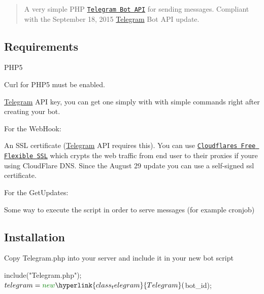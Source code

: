 \begin{quote}
A very simple P\+H\+P \href{https://core.telegram.org/bots}{\tt Telegram Bot A\+P\+I} for sending messages. Compliant with the September 18, 2015 \hyperlink{class_telegram}{Telegram} Bot A\+P\+I update. \end{quote}


\subsection*{Requirements }


\begin{DoxyItemize}
\item P\+H\+P5
\item Curl for P\+H\+P5 must be enabled.
\item \hyperlink{class_telegram}{Telegram} A\+P\+I key, you can get one simply with \href{https://core.telegram.org/bots#botfather}{\tt } with simple commands right after creating your bot.
\end{DoxyItemize}

For the Web\+Hook\+:
\begin{DoxyItemize}
\item An S\+S\+L certificate (\hyperlink{class_telegram}{Telegram} A\+P\+I requires this). You can use \href{https://www.cloudflare.com/ssl}{\tt Cloudflare\textquotesingle{}s Free Flexible S\+S\+L} which crypts the web traffic from end user to their proxies if you\textquotesingle{}re using Cloud\+Flare D\+N\+S. Since the August 29 update you can use a self-\/signed ssl certificate.
\end{DoxyItemize}

For the Get\+Updates\+:
\begin{DoxyItemize}
\item Some way to execute the script in order to serve messages (for example cronjob)
\end{DoxyItemize}

\subsection*{Installation }


\begin{DoxyItemize}
\item Copy Telegram.\+php into your server and include it in your new bot script 
\begin{DoxyCode}
include(\textcolor{stringliteral}{"Telegram.php"});
$telegram = \textcolor{keyword}{new} \hyperlink{class_telegram}{Telegram}($bot\_id);
\end{DoxyCode}

\end{DoxyItemize}

